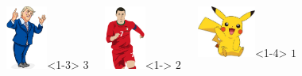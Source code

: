 \begin{frame}
\begin{columns}
  \begin{center}
    \includegraphics[height=2.1cm]{Image/trump.jpg}<1-3>
    $3$
  \end{center}

    \begin{center}
      \includegraphics[height=2.1cm]{Image/ronaldo.png}<1->
      $2$
    \end{center}

  \begin{center}
    \includegraphics[height=1.7cm]{Image/pikachu.jpg}<1-4>
    $1$
  \end{center}

  \end{columns}

\end{frame}
